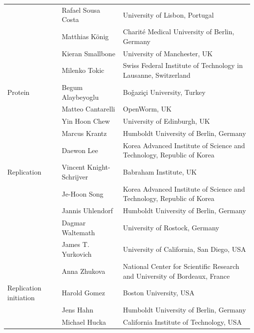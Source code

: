 \documentclass[journal,transmag]{IEEEtran}
\begin{document}
\begin{table}[ht!]
\begin{tabularx}{\textwidth}{llX}
                          & Rafael Sousa Costa               & University of Lisbon, Portugal\\
                          & Matthias K\"onig                 & Charit\'e Medical University of Berlin, Germany\\
                          & Kieran Smallbone                 & University of Manchester, UK\\
                          & Milenko Tokic                    & Swiss Federal Institute of Technology in Lausanne, Switzerland\\
\midrule
Protein                   & Begum Alaybeyoglu                & Bo\v{g}azi\c{c}i University, Turkey\\
                          & Matteo Cantarelli                & OpenWorm, UK\\
                          & Yin Hoon Chew                    & University of Edinburgh, UK\\
                          & Marcus Krantz                    & Humboldt University of Berlin, Germany\\
                          & Daewon Lee                       & Korea Advanced Institute of Science and Technology, Republic of Korea\\
\midrule
Replication               & Vincent Knight-Schrijver         & Babraham Institute, UK\\
                          & Je-Hoon Song                     & Korea Advanced Institute of Science and Technology, Republic of Korea\\
                          & Jannis Uhlendorf                 & Humboldt University of Berlin, Germany\\
                          & Dagmar Waltemath                 & University of Rostock, Germany\\
                          & James T. Yurkovich                  & University of California, San Diego, USA\\
                          & Anna Zhukova                     & National Center for Scientific Research and University of Bordeaux, France\\
\midrule
Replication initiation    & Harold Gomez                     & Boston University, USA\\
                          & Jens Hahn                        & Humboldt University of Berlin, Germany\\
                          & Michael Hucka                    & California Institute of Technology, USA\\

\end{tabularx}
\end{table}
\end{document}
